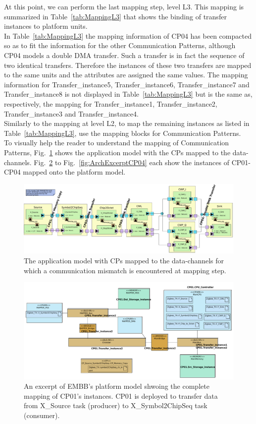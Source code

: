 \documentclass{llncs}
\begin{document}
%
At this point, we can perform the last mapping step, level L3. This mapping is summarized in Table~\ref{tab:MappingL3}
that shows the binding of transfer instances to platform units.\\
%
In Table~\ref{tab:MappingL3} the mapping information of CP04 has been compacted so as to fit the information for the
other Communication Patterns, although CP04 models a double DMA transfer. Such a transfer is in fact the sequence of two
identical transfers. Therefore the instances of these two transfers are mapped to the same units and the attributes are
assigned the same values. The mapping information for Transfer\_instance5, Transfer\_instance6, Transfer\_instance7 and
Transfer\_instance8 is not displayed in Table~\ref{tab:MappingL3} but is the same as, respectively, the mapping for
Transfer\_instance1, Transfer\_instance2, Transfer\_instance3 and Transfer\_instance4.\\
%
Similarly to the mapping at level L2, to map the remaining instances as listed in Table~\ref{tab:MappingL3}, use the
mapping blocks for Communication Patterns.\\
%
To visually help the reader to understand the mapping of Communication Patterns, Fig.~\ref{fig:ZigbeeTXMapped} shows the
application model with the CPs mapped to the data-channels. Fig.~\ref{fig:ArchExcerptCP01} to
Fig.~\ref{fig:ArchExcerptCP04} each show the instances of CP01-CP04 mapped onto the platform model.
%
\begin{figure}[!htbp]
	\centering
	\includegraphics[angle=90,origin=c,height=0.8\paperwidth]{figures/evaluation/ZigbeeAppMapp.pdf}
    \caption{The application model with CPs mapped to the data-channels for which a communication mismatch is
    encountered at mapping step.}
	\label{fig:ZigbeeTXMapped}
\end{figure}
%
\begin{figure}[!htbp]
	\centering
	\includegraphics[angle=90,origin=c,
height=0.8\paperwidth]{figures/evaluation/MappingCP01.pdf} \caption{An excerpt of EMBB's platform model shwoing the complete mapping of CP01's instances. CP01 is deployed to
        transfer data from X\_Source task (producer) to X\_Symbol2ChipSeq task (consumer).}
	\label{fig:ArchExcerptCP01}
\end{figure}
\end{document}
